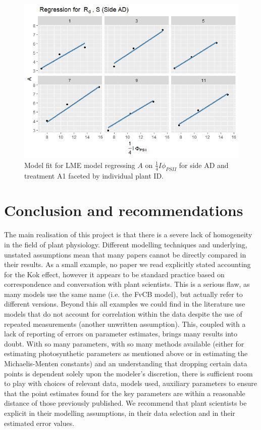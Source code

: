 \documentclass[11pt]{article} %
\begin{document}
\begin{figure}[h]
\centering
\includegraphics[scale=0.85]{Images/rd_s_ad}
\caption{Model fit for LME model regressing $A$ on $\frac{1}{4} I \phi_{PSII}$ for side AD and treatment A1 faceted by individual plant ID.}
\label{fig:lme_fit_ad}
\end{figure}

\section{Conclusion and recommendations}
The main realisation of this project is that there is a severe lack of homogeneity in the field of plant physiology. Different modelling techniques and underlying, unstated assumptions mean that many papers cannot be directly compared in their results. As a small example, no paper we read explicitly stated accounting for the Kok effect, however it appears to be standard practice based on correspondence and conversation with plant scientists. This is a serious flaw, as many models use the same name (i.e. the FvCB model), but actually refer to different versions. Beyond this all examples we could find in the literature use models that do not account for correlation within the data despite the use of repeated measurements (another unwritten assumption). This, coupled with a lack of reporting of errors on parameter estimates, brings many results into doubt. With so many parameters, with so many methods available (either for estimating photosynthetic parameters as mentioned above or in estimating the Michaelis-Menten constants) and an understanding that dropping certain data points is dependent solely upon the modeler's discretion, there is sufficient room to play with choices of relevant data, models used, auxiliary parameters to ensure that the point estimates found for the key parameters are within a reasonable distance of those previously published. We recommend that plant scientists be explicit in their modelling assumptions, in their data selection and in their estimated error values. 
\end{document}

